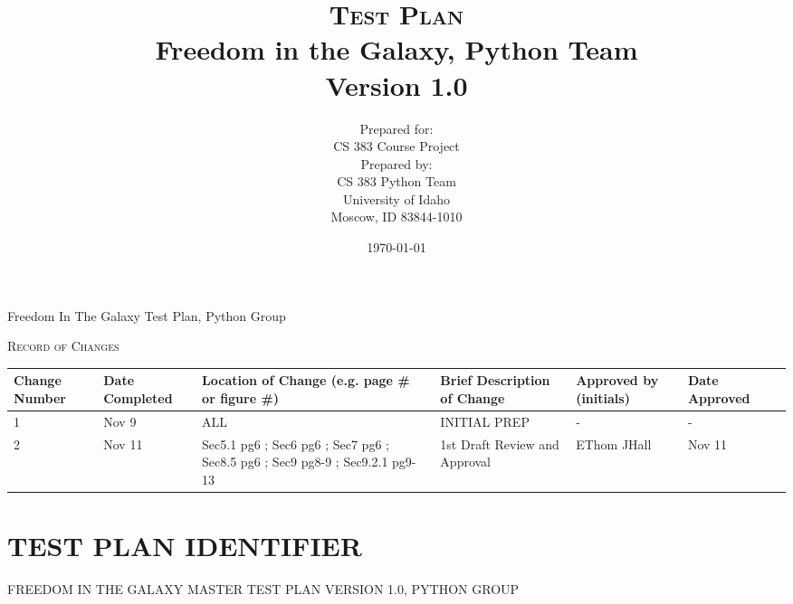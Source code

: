 \documentclass[report]{article}
\begin{document}
\title{\textsc{Test Plan}
  \\ Freedom in the Galaxy, Python Team
  \vspace{10 mm}
  \\ Version 1.0
  \vspace{10 mm}}
  
\date{\today}

\author{Prepared for:
  \\ CS 383 Course Project
  \vspace{10 mm}
  \\Prepared by:
  \\ CS 383 Python Team
  \\ University of Idaho
  \\ Moscow, ID 83844-1010
  \vspace{10 mm}}


\maketitle
\newpage 

\begin{center}
\noindent Freedom In The Galaxy Test Plan, Python Group

\vspace{10 mm}

\noindent \textsc{Record of Changes}   

\vspace{10 mm}


\begin{tabularx}{\textwidth}{| X | X | X | X | X | X | X |}
  \hline
  \textbf{Change Number} &
    \textbf{Date Completed} &
    \textbf{Location of Change (e.g. page \# or figure \#)} &
    \textbf{Brief Description of Change} &
    \textbf{Approved by (initials)} &
    \textbf{Date Approved} 
    \\ \hline 1 & Nov 9 & ALL  & INITIAL PREP & - & -
    \\ \hline 2 & Nov 11 & Sec5.1 pg6 ; Sec6 pg6 ; Sec7 pg6 ; Sec8.5 pg6 ; Sec9 pg8-9 ; Sec9.2.1 pg9-13 & 1st Draft Review and Approval & EThom JHall & Nov 11  
    \\ \hline
\end{tabularx}
\end{center}
\newpage 
\tableofcontents
\newpage

\section[IDENTIFIER]{TEST PLAN IDENTIFIER}
FREEDOM IN THE GALAXY MASTER TEST PLAN VERSION 1.0, PYTHON GROUP
\end{document}
